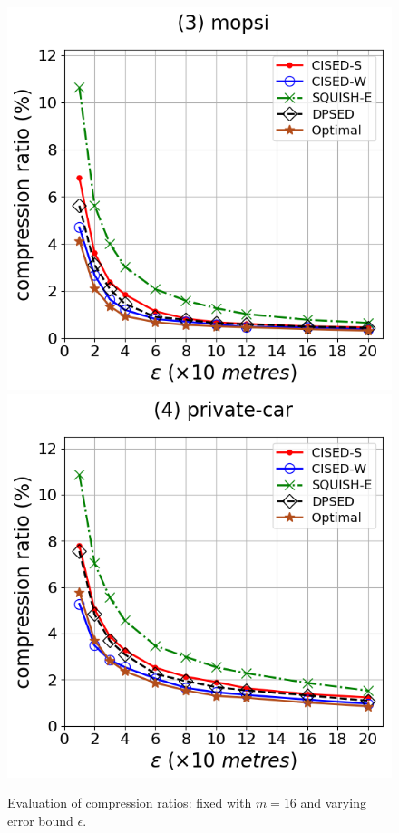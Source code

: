 \begin{figure}[tb!]
\includegraphics[scale = 0.275]{Figures/Exp-opt-CR-epsilon-mopsi.png}\hspace{3ex}
\includegraphics[scale = 0.275]{Figures/Exp-opt-CR-epsilon-private.png}
\caption{\small Evaluation of compression ratios: fixed with $m=16$ and varying error bound $\epsilon$.}
\label{fig:cr-optimal-m16}
\vspace{-1.0ex}
\end{figure}



